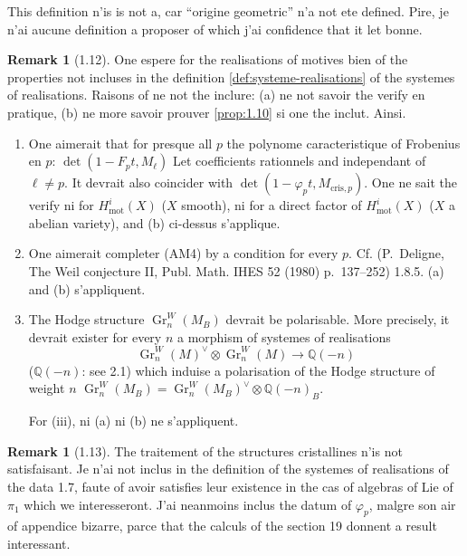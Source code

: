 \documentclass[12pt,a4paper]{article}
\theoremstyle{plain}
\theoremstyle{definition}
\newtheorem{remark}[theorem]{Remark}
\theoremstyle{remark}
\DeclareMathOperator{\Gr}{Gr}
\newcommand{\mot}{\mathrm{mot}}
\providecommand{\mot}{\mathrm{mot}}
\providecommand{\cris}{\mathrm{cris}}
\begin{document}
This definition n'is is not a, car ``origine geometric'' n'a not ete
defined. Pire, je n'ai aucune definition a proposer of which j'ai confidence that it let
bonne.

\begin{remark}[1.12]\label{rem:1.12}
One espere for the realisations of motives bien of the properties not incluses in the
definition \ref{def:systeme-realisations} of the systemes of realisations. Raisons of ne
not the inclure: (a) ne not savoir the verify en pratique, (b) ne more savoir prouver
\ref{prop:1.10} si one the inclut. Ainsi.

\begin{enumerate}[label=(\roman*)]
\item One aimerait that for presque all $p$ the polynome caracteristique of Frobenius
en $p$: $\det(1 - F_p t, M_\ell)$ Let coefficients rationnels and independant of
$\ell \neq p$. It devrait also coincider with $\det(1 - \varphi_p t, M_{\cris,p})$. One ne sait the verify ni for
$H^i_\mot(X)$ ($X$ smooth), ni for a direct factor of $H^i_\mot(X)$ ($X$ a abelian variety), and (b) ci-dessus s'applique.

\item One aimerait completer (AM4) by a condition for every $p$. Cf. (P.~Deligne, The Weil conjecture II, Publ. Math. IHES 52 (1980) p.~137--252) 1.8.5. (a) and (b)
s'appliquent.

\item The Hodge structure $\Gr^W_n(M_B)$ devrait be polarisable. More precisely,
it devrait exister for every $n$ a morphism of systemes of realisations
\[
\Gr^W_n(M)^\vee \otimes \Gr^W_n(M) \longrightarrow \mathbb{Q}(-n)
\]
($\mathbb{Q}(-n)$: see 2.1) which induise a polarisation of the Hodge structure of
weight $n$ $\Gr^W_n(M_B) = \Gr^W_n(M_B)^\vee \otimes \mathbb{Q}(-n)_B$.

For (iii), ni (a) ni (b) ne s'appliquent.
\end{enumerate}
\end{remark}

\begin{remark}[1.13]\label{rem:1.13}
The traitement of the structures cristallines n'is not satisfaisant. Je n'ai not inclus in
the definition of the systemes of realisations of the data 1.7, faute of avoir satisfies
leur existence in the cas of algebras of Lie of $\pi_1$ which we interesseront. J'ai
neanmoins inclus the datum of $\varphi_p$, malgre son air of appendice bizarre, parce
that the calculs of the section 19 donnent a result interessant.
\end{remark}
\end{document}
